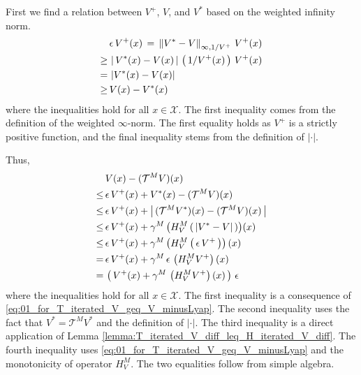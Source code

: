 \documentclass[journal]{IEEEtran}
\newcommand{\bcol}[1]{{\color{black}#1}}
\newcommand{\kcol}[1]{{\color{black}#1}}
\newcommand{\mcal}{\mathcal}
\newcommand{\xinX}{x\!\in\!\mathcal{X}}
\begin{document}
\vspace{0.2cm}

\begin{IEEEproof}
	First we find a relation between $V^+$, $V$, and $V^\ast$ based on the weighted infinity norm.
	\begin{equation} \label{eq:01_for_T_iterated_V_geq_V_minusLyap} \begin{aligned}
			&\, \epsilon \, V^+(x) \,=\,
				\left\| V^\ast - V \right\|_{\infty,1/V^+} \, V^+(x)
			\\
			\kcol{\geq}&\, \left|\, V^\ast(\bcol{x}) - V(\bcol{x}) \,\right| \, \left(\, 1 / V^+(\bcol{x}) \,\right) \, V^+(\bcol{x})
			\\
			=&\, \left| V^\ast(x) - V(x)\right|
			\\
			\kcol{\geq}&\, V(x) - V^\ast(x)
		\end{aligned}
	\end{equation}
where the inequalities hold for all $\xinX$. The first inequality comes from the definition of the weighted $\infty$-norm. The first equality holds as $V^+$ is a strictly positive function, and the final inequality stems from the definition of $|\cdot|$.
	
	Thus,
	\begin{equation} \nonumber
		\begin{aligned}
			&\,V(x) - (\mcal{T}^M V)(x)
			\\
			\leq&\, \bcol{ \epsilon \, V^+(x) + V^\ast(x) } - (\mcal{T}^M V)(x)
			\\
			\leq&\, \epsilon \, V^+(x) + \left|\, (\bcol{\mcal{T}^M} V^\ast)(x) - (\mcal{T}^M V)(x) \,\right|
			\\
			\leq&\, \epsilon \, V^+(x) + \bcol{ \gamma^M \left( H_V^M \left(\, \left| \kcol{ V^\ast - V } \right| \,\right) \right) }(x)
			\\
			\leq&\, \epsilon \, V^+(x) + \gamma^M \left( H_V^M \left(\, \bcol{ \epsilon \, V^+ } \,\right) \right)(x)
			\\
			=&\, \epsilon \, V^+(x) + \gamma^M \, \bcol{\epsilon} \, \left( H_V^M  V^+ \right)(x)
			\\
			=&\, \left(\, V^+(x) + \gamma^M \, \left( H_V^M  V^+ \right)(x) \,\right) \, \epsilon
		\end{aligned}
	\end{equation} 
	where the inequalities hold for all $\xinX$. The first inequality is a consequence of \eqref{eq:01_for_T_iterated_V_geq_V_minusLyap}. The second inequality uses the fact that $V^\ast \!=\! \mcal{T}^M V^\ast$ and the definition of $|\cdot|$. The third inequality is a direct application of Lemma \ref{lemma:T_iterated_V_diff_leq_H_iterated_V_diff}. The fourth inequality uses \eqref{eq:01_for_T_iterated_V_geq_V_minusLyap} and the monotonicity of operator $H_V^M$. The two equalities follow from simple algebra. 
\end{IEEEproof}
\end{document}
